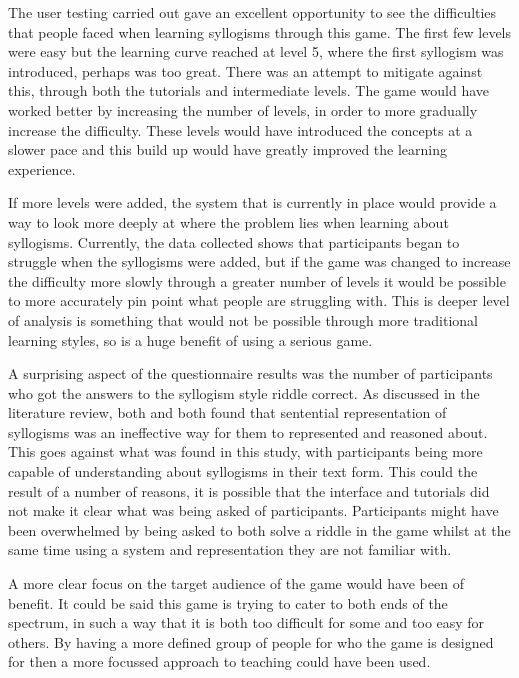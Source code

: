 \documentclass[12pt,a4paper]{report}
\begin{document}
The user testing carried out gave an excellent opportunity to see the difficulties that people faced when learning syllogisms through this game. The first few levels were easy but the learning curve reached at level 5, where the first syllogism was introduced, perhaps was too great. There was an attempt to mitigate against this, through both the tutorials and intermediate levels. The game would have worked better by increasing the number of levels, in order to more gradually increase the difficulty. These levels would have introduced the concepts at a slower pace and this build up would have greatly improved the learning experience.

If more levels were added, the system that is currently in place would provide a way to look more deeply at where the problem lies when learning about syllogisms. Currently, the data collected shows that participants began to struggle when the syllogisms were added, but if the game was changed to increase the difficulty more slowly through a greater number of levels it would be possible to more accurately pin point what people are struggling with. This is deeper level of analysis is something that would not be possible through more traditional learning styles, so is a huge benefit of using a serious game.

A surprising aspect of the questionnaire results was the number of participants who got the answers to the syllogism style riddle correct. As discussed in the literature review, both \cite{larkin1987diagram} and \cite{johnson1980mental} both found that sentential representation of syllogisms was an ineffective way for them to represented and reasoned about. This goes against what was found in this study, with participants being more capable of understanding about syllogisms in their text form. This could the result of a number of reasons, it is possible that the interface and tutorials did not make it clear what was being asked of participants. Participants might have been overwhelmed by being asked to both solve a riddle in the game whilst at the same time using a system and representation they are not familiar with. 

A more clear focus on the target audience of the game would have been of benefit. It could be said this game is trying to cater to both ends of the spectrum, in such a way that it is both too difficult for some and too easy for others. By having a more defined group of people for who the game is designed for then a more focussed approach to teaching could have been used.
\end{document}
